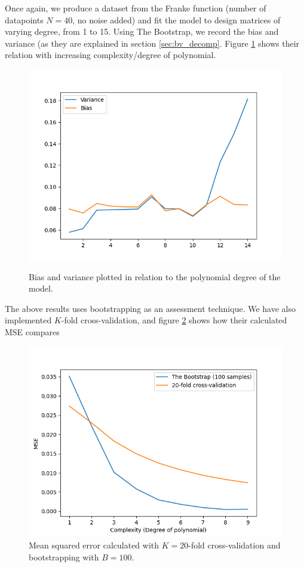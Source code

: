 \documentclass[../main.tex]{subfiles}
\begin{document}
Once again, we produce a dataset from the Franke function (number of datapoints $N=40$, no noise added) and fit the model to design matrices of varying degree, from 1 to 15. Using The Bootstrap, we record the bias and variance (as they are explained in section \ref{sec:bv_decomp}. Figure \ref{fig:result_bias_variance} shows their relation with increasing complexity/degree of polynomial. 

\begin{figure}[h]
    \centering
    \includegraphics[width=\textwidth]{../assets/var.png}
    \label{fig:result_bias_variance}
    \caption{Bias and variance plotted in relation to the polynomial degree of the model.}
\end{figure}

The above results uses bootstrapping as an assessment technique. We have also implemented $K$-fold cross-validation, and figure \ref{fig:result_cv_boot_mse} shows how their calculated MSE compares

\begin{figure}[h]
    \centering
    \includegraphics[width=\textwidth]{../assets/cv_boot_mse.png}
    \caption{Mean squared error calculated with $K=20$-fold cross-validation and bootstrapping with $B=100$.}
    \label{fig:result_cv_boot_mse}
\end{figure}
\end{document}
